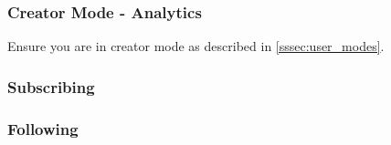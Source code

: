 \documentclass[../report.tex]{subfiles}
\begin{document}
\subsubsection{Creator Mode - Analytics}

Ensure you are in creator mode as described in \cref{sssec:user_modes}. 


\subsubsection{Subscribing}

\subsubsection{Following}
\end{document}
